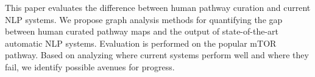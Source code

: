 This paper evaluates the difference between human pathway curation and current NLP systems. We propose graph analysis methods for quantifying              the gap between human curated pathway maps and the output of state-of-the-art automatic NLP systems. Evaluation is performed on the popular mTOR pathway. Based on analyzing where current systems perform well and where they fail, we identify possible avenues for progress.
